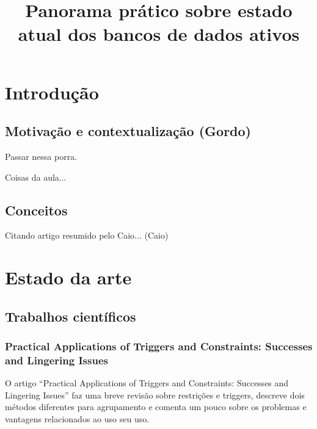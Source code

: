 \documentclass[conference]{IEEEtran}
\begin{document}
\title{Panorama prático sobre estado atual dos bancos de dados ativos}

\author{
}

\maketitle
\IEEEpeerreviewmaketitle

\section{Introdução}
  \subsection{Motivação e contextualização (Gordo)}
	Passar nessa porra.

  Coisas da aula...

  \subsection{Conceitos}
  Citando artigo resumido pelo Caio... (Caio)

\section{Estado da arte}
  \subsection{Trabalhos científicos}
    \subsubsection{Practical Applications of Triggers and Constraints: Successes and Lingering Issues}
    O artigo “Practical Applications of Triggers and Constraints: Successes and Lingering Issues” faz uma breve revisão sobre restrições e triggers, descreve dois métodos diferentes para agrupamento e comenta um pouco sobre os problemas e vantagens relacionados ao uso seu uso.
\end{document}
